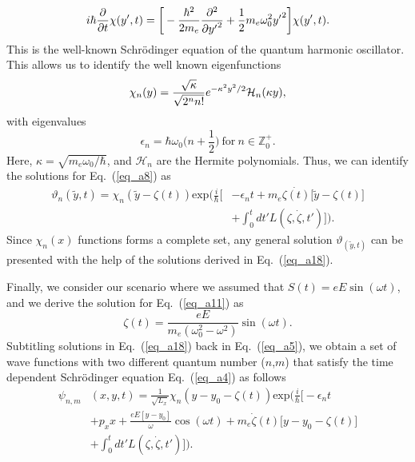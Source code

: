 \begin{equation} \label{eq_a15}
    i \hbar \pdv{t} \chi(y',t)  =
    \bigg[
        -  \frac{\hbar^2}{2m_e}\pdv[2]{{y'}}
        + \frac{1}{2} m_e \omega_0^2 {y'}^2
    \bigg] \chi(y',t).
\end{equation}
This is the well-known Schrödinger equation of the quantum harmonic oscillator.
This allows us to identify the well known eigenfunctions \cite{griffiths18,shankar94}
\begin{equation} \label{eq_a16}
  \chi_n(y) =
   \frac{\sqrt{\kappa}}{\sqrt{2^{n}n!}}
  e^{-\kappa^2 y^2/2}
  \mathcal{H}_n \qty(\kappa y),
\end{equation}
with eigenvalues
\begin{equation} \label{eq_a17}
  \epsilon_n = \hbar \omega_0 \bigg(n + \frac{1}{2}\bigg)
  ~\text{for}~
  n \in \mathbb{Z}^{+}_0.
\end{equation}
Here, $\kappa = \sqrt{{m_e \omega_0}/{\hbar}}$, and $\mathcal{H}_n$ are the Hermite polynomials.
Thus, we can identify the solutions for Eq.~(\ref{eq_a8}) as
\begin{equation} \label{eq_a18}
  \begin{aligned}
    \vartheta_n(\tilde{y},t) = \chi_n(\tilde{y} - \zeta(t))
     \text{exp}\bigg(\frac{i}{\hbar}\bigg[&- \epsilon_nt +
    m_e\dot{\zeta(t)}\big[\tilde{y}-\zeta(t)\big] \\
     & + \int_0^{t}dt'L(\zeta,\dot{\zeta},t')\bigg]\bigg).
  \end{aligned}
\end{equation}
Since $\chi_n(x)$ functions forms a complete set, any general solution $\vartheta_(\tilde{y},t)$ can be presented with the help of the solutions derived in Eq.~(\ref{eq_a18}).

Finally, we consider our scenario where we assumed that $S(t) = eE\sin(\omega t)$, and we derive the solution for Eq.~(\ref{eq_a11}) as
\begin{equation} \label{eq_a19}
  \zeta(t) = \frac{eE}{m_e(\omega_0^2 - \omega^2)}\sin(\omega t).
\end{equation}
Subtitling solutions in Eq.~(\ref{eq_a18}) back in Eq.~(\ref{eq_a5}), we obtain a set of wave functions with two different quantum number ($n$,$m$) that satisfy the time dependent Schrödinger equation Eq.~(\ref{eq_a4}) as follows
\begin{equation} \label{eq_a20}
  \begin{aligned}
    \psi_{n,m}&(x,y,t)  = \frac{1}{\sqrt{L_x}}
    \chi_n\left(y - y_0 - \zeta(t)\right)
    \text{exp}\bigg(
    \frac{i}{\hbar}\bigg[- \epsilon_nt \\
    &
    + p_x x + \frac{eE[y - y_0]}{\omega}\cos(\omega t)+
    m_e\dot{\zeta}(t)\big[y - y_0 -\zeta(t)\big]\\
    & +
    \int_0^{t}dt'L(\zeta,\dot{\zeta},t')\bigg]\bigg).
  \end{aligned}
\end{equation}
